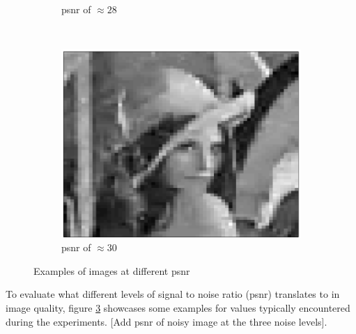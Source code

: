 \documentclass{article}
\begin{document}
\begin{figure}[h]
\begin{subfigure}[b]{0.19\textwidth}
				\caption{psnr of $\approx 28$}
				\label{psnr_28}
		\end{subfigure}%
		~ %
		\begin{subfigure}[b]{0.19\textwidth}
                \centering
				\includegraphics[width=\textwidth]{img/img_30_psnr}
				\caption{psnr of $\approx 30$}
				\label{psnr_30}
		\end{subfigure}%
		\caption{Examples of images at different psnr}
		\label{img_examples}
\end{figure}

To evaluate what different levels of signal to noise ratio (psnr) 
translates to in image quality, figure \ref{img_examples} showcases some 
examples for values typically encountered during the experiments. [Add 
psnr of noisy image at the three noise levels]. 



% 
\end{document}
